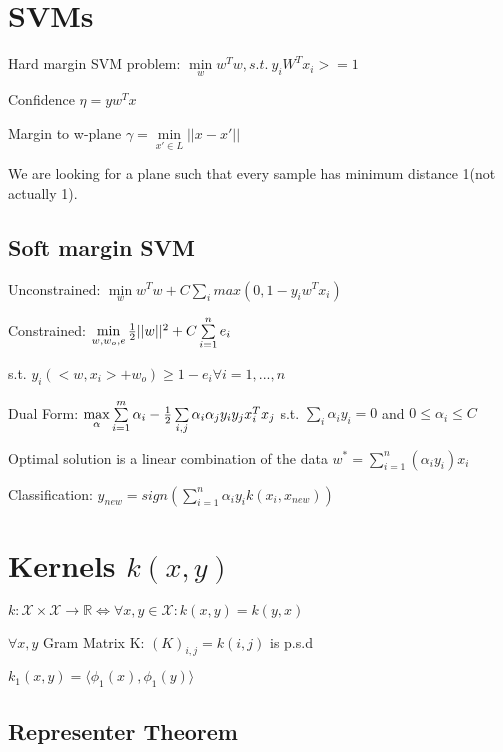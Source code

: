 \documentclass[11pt,twocolumn]{article}
\begin{document}
\section{SVMs}
Hard margin SVM problem: $\min \limits_w w^Tw , s.t.~ y_i W^T x_i >= 1$



Confidence $\eta = y w^T x$

Margin to w-plane $\gamma = \min \limits_{x' \in L} ||x-x'|| $

We are looking for a plane such that every sample has minimum distance 1(not actually 1).


\subsection{Soft margin SVM}

Unconstrained: $\min \limits_w w^Tw + C \sum \limits_i max\left(0, 1-y_iw^Tx_i\right)$


Constrained: $\min \limits_{w,w_o, e} {{1 \over 2} ||w||^2 + C \sum \limits_{i=1}^n {e_i}}$ 

s.t. $ y_i \left( <w, x_i> + w_o \right) \geq 1 - e_i \forall i = 1,...,n$


Dual Form: $ \max \limits_{\alpha} \sum \limits_{i=1}^m \alpha_i - {1 \over 2} \sum \limits_{i,j} \alpha_i \alpha_j y_i y_j x_i^T x_j$ s.t. $\sum \limits_i \alpha_i y_i  = 0$ and $0 \leq \alpha_i \leq C$


Optimal solution is a linear combination of the data $w^* = \sum \limits_{i=1}^n \left( \alpha_i y_i \right) x_i$

Classification: $y_{new} = sign(  \sum \limits_{i=1}^n \alpha_i y_i  k(x_i, x_{new})  )$

\section{Kernels $k(x,y)$}

$k: \mathcal{X} \times \mathcal{X} \rightarrow \mathbb{R}  \Leftrightarrow \forall x,y \in \mathcal{X} : k\left( x , y \right) = k \left(y,x\right)$

$\forall x, y$
Gram Matrix K: $(K)_{i,j} = k(i,j)$ is p.s.d

$k_1(x,y) = \langle \phi_1(x), \phi_1(y) \rangle $

\subsection{Representer Theorem}
\end{document}
